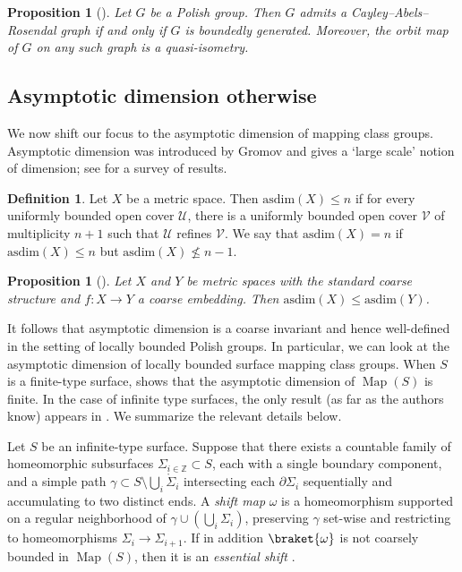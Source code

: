 \documentclass[twoside]{amsart}
\theoremstyle{plain}
\newtheorem{proposition}[theorem]{Proposition}
\theoremstyle{break}
\theoremstyle{definition}
\newtheorem{definition}[theorem]{Definition}
\theoremstyle{remark}
\newcommand{\Z}{\mathbb{Z}}
\DeclareMathOperator{\Map}{Map}
\begin{document}
\begin{proposition}[{\cite[Prop.~8]{bdhl}}]\label{prop:car}
  Let $G$ be a Polish group.  Then $G$ admits a
  Cayley--Abels--Rosendal graph if and only if $G$ is boundedly generated.
  Moreover, the orbit map of $G$ on any such graph is a
  quasi-isometry.
\end{proposition}


\subsection{Asymptotic dimension otherwise}\label{sec:asdim_ow}

We now shift our focus to the asymptotic dimension 
of mapping class groups. 
Asymptotic dimension was introduced by 
Gromov and gives a `large scale' notion of dimension; see
\cite{asdim_bell} for a survey of results.

\begin{definition}
    Let $X$ be a metric space. Then $\text{asdim}(X)\leq n$ if for
    every uniformly bounded open cover $\mathcal{U}$, there is a
    uniformly bounded open cover $\mathcal{V}$ of multiplicity $n+1$
    such that $\mathcal{U}$ refines $\mathcal{V}$. We say that
    $\text{asdim}(X)=n$ if $\text{asdim}(X)\leq n$ but 
    $\text{asdim}(X)\not\leq n-1$.
\end{definition}

\begin{proposition}[{\cite[Prop.~22]{asdim_bell}}]\label{prop:coarse_inv_asdim}
    Let $X$ and $Y$ be metric spaces with the standard coarse
    structure and $f:X\rightarrow Y$ a coarse embedding. 
    Then $\text{asdim}(X)\leq \text{asdim}(Y)$.
\end{proposition}

It follows that asymptotic dimension is a coarse
invariant and hence well-defined in the setting of locally bounded
Polish groups. In particular, we can look at the asymptotic
dimension of locally bounded surface mapping class groups. When $S$
is a finite-type surface, {\cite{bbf}} shows that the asymptotic
dimension of $\Map(S)$ is finite. In the case of infinite type
surfaces, the only result (as far as the authors know) appears in
{\cite{shift}}. We summarize the relevant details below.


Let $S$ be an infinite-type surface. 
Suppose that there exists a countable family of homeomorphic
subsurfaces $\Sigma_{i\in \Z} \subset S$, each with a single
boundary component, and a simple path 
$\gamma \subset S \setminus \bigcup_i
\mathring \Sigma_i$ intersecting each $\partial \Sigma_i$
sequentially and accumulating to two distinct ends. A \textit{shift
map} $\omega$ is
a homeomorphism supported on a regular neighborhood of
$\gamma \cup \left(\bigcup_i \Sigma_i\right)$, preserving $\gamma$ set-wise and
restricting to homeomorphisms $\Sigma_i \to \Sigma_{i+1}$.
If in addition $\braket{\omega}$ is not coarsely bounded in
$\Map(S)$, then it is an \textit{essential shift} \cite[\S1]{shift}.
\end{document}
